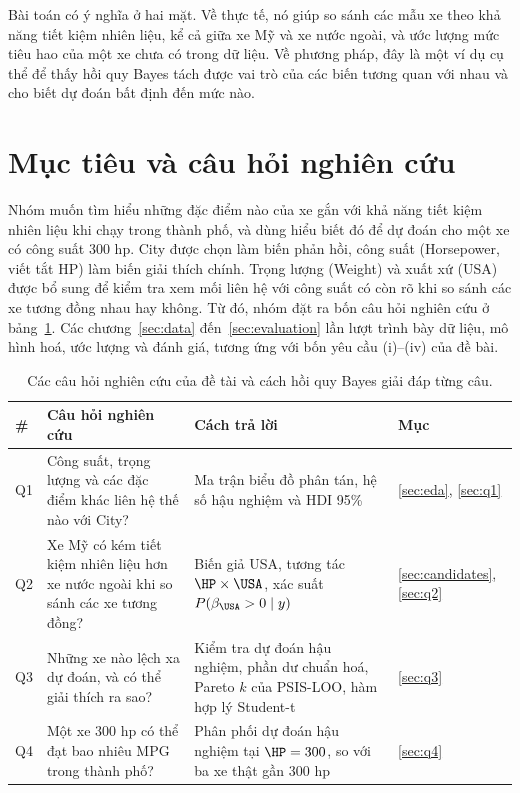 \documentclass[12pt,a4paper]{report}
\begin{document}
Bài toán có ý nghĩa ở hai mặt. Về thực tế, nó giúp so sánh các mẫu xe theo khả
năng tiết kiệm nhiên liệu, kể cả giữa xe Mỹ và xe nước ngoài, và ước lượng mức
tiêu hao của một xe chưa có trong dữ liệu. Về phương pháp, đây là một ví dụ cụ
thể để thấy hồi quy Bayes tách được vai trò của các biến tương quan với nhau và
cho biết dự đoán bất định đến mức nào.

\section{Mục tiêu và câu hỏi nghiên cứu}

Nhóm muốn tìm hiểu những đặc điểm nào của xe gắn với khả năng tiết kiệm nhiên
liệu khi chạy trong thành phố, và dùng hiểu biết đó để dự đoán cho một xe có
công suất 300 hp. City được chọn làm biến phản hồi, công suất (Horsepower, viết
tắt HP) làm biến giải thích chính. Trọng lượng (Weight) và xuất xứ (USA) được
bổ sung để kiểm tra xem mối liên hệ với công suất có còn rõ khi so sánh các xe
tương đồng nhau hay không. Từ đó, nhóm đặt ra bốn câu hỏi nghiên cứu ở
bảng~\ref{tab:questions}. Các chương~\ref{sec:data} đến~\ref{sec:evaluation}
lần lượt trình bày dữ liệu, mô hình hoá, ước lượng và đánh giá, tương ứng với
bốn yêu cầu (i)--(iv) của đề bài.

\begin{table}[tp]
  \centering
  \caption{Các câu hỏi nghiên cứu của đề tài và cách hồi quy Bayes giải đáp từng câu.}
  \label{tab:questions}
  \begin{tabular}{l>{\raggedright}p{5.2cm}>{\raggedright}p{7.6cm}l}
    \toprule
    \# & Câu hỏi nghiên cứu & Cách trả lời & Mục \\
    \midrule
    Q1 & Công suất, trọng lượng và các đặc điểm khác liên hệ thế nào với City?
       & Ma trận biểu đồ phân tán, hệ số hậu nghiệm và HDI 95\% & \ref{sec:eda}, \ref{sec:q1} \\
    Q2 & Xe Mỹ có kém tiết kiệm nhiên liệu hơn xe nước ngoài khi so sánh các xe tương đồng?
       & Biến giả USA, tương tác $\HP \times \USA$, xác suất $P(\beta_{\USA} > 0 \mid y)$
       & \ref{sec:candidates}, \ref{sec:q2} \\
    Q3 & Những xe nào lệch xa dự đoán, và có thể giải thích ra sao?
       & Kiểm tra dự đoán hậu nghiệm, phần dư chuẩn hoá, Pareto $k$ của PSIS-LOO, hàm hợp lý Student-t
       & \ref{sec:q3} \\
    Q4 & Một xe 300 hp có thể đạt bao nhiêu MPG trong thành phố?
       & Phân phối dự đoán hậu nghiệm tại $\HP = 300$, so với ba xe thật gần 300 hp
       & \ref{sec:q4} \\
    \bottomrule
  \end{tabular}
\end{table}
\end{document}
